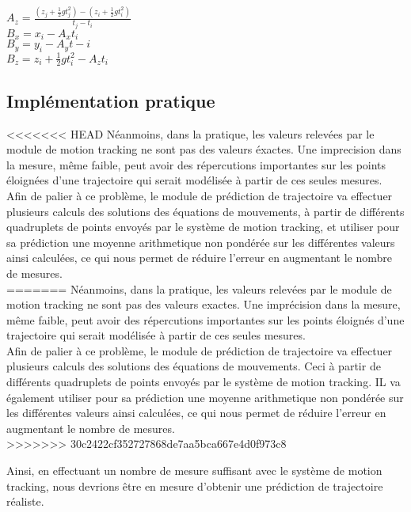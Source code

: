 $A_z = \frac{(z_j + \frac{1}{2} g t_j^2)-(z_i + \frac{1}{2} g t_i^2)}{t_j-t_i}$\\

$B_x = x_i - A_x t_i$\\

$B_y = y_i - A_y t-i$\\

$B_z = z_i + \frac{1}{2} g t_i^2 - A_z t_i$\\

\subsection{Implémentation pratique}

<<<<<<< HEAD
Néanmoins, dans la pratique, les valeurs relevées par le module de motion tracking ne sont pas des valeurs éxactes. Une imprecision dans la mesure, même faible, peut avoir des répercutions importantes sur les points éloignées d'une trajectoire qui serait modélisée à partir de ces seules mesures.\\

Afin de palier à ce problème, le module de prédiction de trajectoire va effectuer plusieurs calculs des solutions des équations de mouvements, à partir de différents quadruplets de points envoyés par le système de motion tracking, et utiliser pour sa prédiction une moyenne arithmetique non pondérée sur les différentes valeurs ainsi calculées, ce qui nous permet de réduire l'erreur en augmentant le nombre de mesures. \\
=======
Néanmoins, dans la pratique, les valeurs relevées par le module de motion tracking ne sont pas des valeurs exactes. Une imprécision dans la mesure, même faible, peut avoir des répercutions importantes sur les points éloignés d'une trajectoire qui serait modélisée à partir de ces seules mesures.\\

Afin de palier à ce problème, le module de prédiction de trajectoire va effectuer plusieurs calculs des solutions des équations de mouvements. Ceci à partir de différents quadruplets de points envoyés par le système de motion tracking. IL va également utiliser pour sa prédiction une moyenne arithmetique non pondérée sur les différentes valeurs ainsi calculées, ce qui nous permet de réduire l'erreur en augmentant le nombre de mesures. \\
>>>>>>> 30c2422cf352727868de7aa5bca667e4d0f973c8

Ainsi, en effectuant un nombre de mesure suffisant avec le système de motion tracking, nous devrions être en mesure d'obtenir une prédiction de trajectoire réaliste.
\newpage
